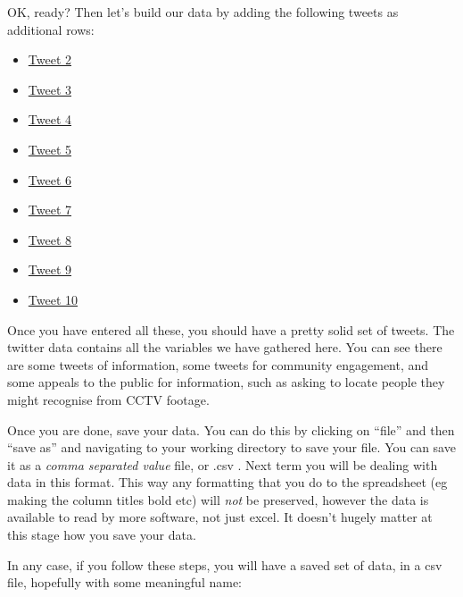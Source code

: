 \documentclass[]{book}
\providecommand{\tightlist}{%
  \setlength{\itemsep}{0pt}\setlength{\parskip}{0pt}}
\theoremstyle{definition}
\theoremstyle{definition}
\theoremstyle{definition}
\theoremstyle{remark}
\begin{document}
OK, ready? Then let's build our data by adding the following tweets as
additional rows:

\begin{itemize}
\tightlist
\item
  \href{https://twitter.com/GMPCityCentre/status/891762454337867776}{Tweet
  2}
\item
  \href{https://twitter.com/GMPCityCentre/status/894515606321590273}{Tweet
  3}
\item
  \href{https://twitter.com/GMPCityCentre/status/894024570109386752}{Tweet
  4}
\item
  \href{https://twitter.com/GMPCityCentre/status/891247668772708352}{Tweet
  5}
\item
  \href{https://twitter.com/GMPCityCentre/status/891254643078176768}{Tweet
  6}
\item
  \href{https://twitter.com/GMPCityCentre/status/890871354924421120}{Tweet
  7}
\item
  \href{https://twitter.com/GMPCityCentre/status/890594946536927233}{Tweet
  8}
\item
  \href{https://twitter.com/GMPCityCentre/status/890161961626996736}{Tweet
  9}
\item
  \href{https://twitter.com/GMPCityCentre/status/889084990495051776}{Tweet
  10}
\end{itemize}

Once you have entered all these, you should have a pretty solid set of
tweets. The twitter data contains all the variables we have gathered
here. You can see there are some tweets of information, some tweets for
community engagement, and some appeals to the public for information,
such as asking to locate people they might recognise from CCTV footage.

Once you are done, save your data. You can do this by clicking on
``file'' and then ``save as'' and navigating to your working directory
to save your file. You can save it as a \emph{comma separated value}
file, or .csv . Next term you will be dealing with data in this format.
This way any formatting that you do to the spreadsheet (eg making the
column titles bold etc) will \emph{not} be preserved, however the data
is available to read by more software, not just excel. It doesn't hugely
matter at this stage how you save your data.

In any case, if you follow these steps, you will have a saved set of
data, in a csv file, hopefully with some meaningful name:
\end{document}
